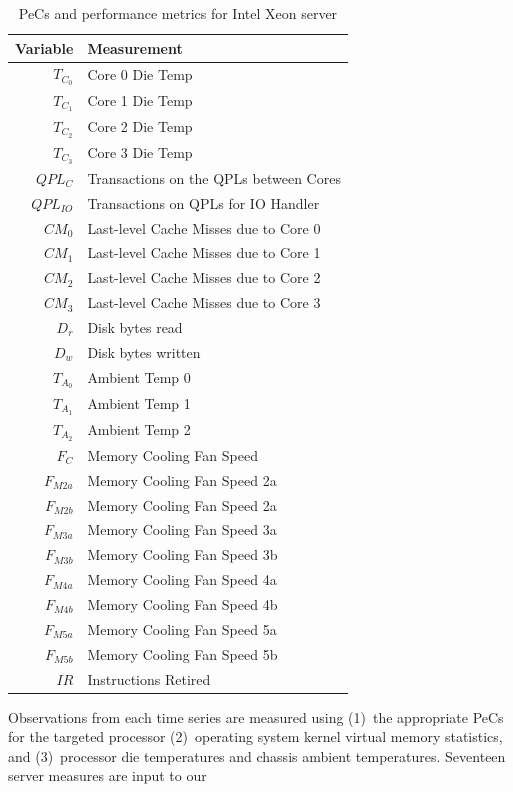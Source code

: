 \documentclass[times, 10pt,twocolumn]{IEEEtran}
\begin{document}
\begin{table}[tbhp]
  \centering
  \caption{PeCs and performance metrics for Intel Xeon server}
  \label{tab:intelmodel}
  \begin{tabular}{r l}
\hline
\textbf{Variable}&\textbf{Measurement}\\
\hline
$T_{C_{0}}$&Core 0 Die Temp\\
$T_{C_{1}}$&Core 1 Die Temp\\
$T_{C_{2}}$&Core 2 Die Temp\\
$T_{C_{3}}$&Core 3 Die Temp\\
$QPL_{C}$&Transactions on the QPLs between Cores\\
$QPL_{IO}$&Transactions on QPLs for IO Handler\\
$CM_{0}$&Last-level Cache Misses due to Core 0\\
$CM_{1}$&Last-level Cache Misses due to Core 1\\
$CM_{2}$&Last-level Cache Misses due to Core 2\\
$CM_{3}$&Last-level Cache Misses due to Core 3\\
$D_{r}$&Disk bytes read\\
$D_{w}$&Disk bytes written\\
$T_{A_{0}}$&Ambient Temp 0\\
$T_{A_{1}}$&Ambient Temp 1\\
$T_{A_{2}}$&Ambient Temp 2\\
$F_{C}$&Memory Cooling Fan Speed\\
$F_{M2a}$&Memory Cooling Fan Speed 2a\\
$F_{M2b}$&Memory Cooling Fan Speed 2a\\
$F_{M3a}$&Memory Cooling Fan Speed 3a\\
$F_{M3b}$&Memory Cooling Fan Speed 3b\\
$F_{M4a}$&Memory Cooling Fan Speed 4a\\
$F_{M4b}$&Memory Cooling Fan Speed 4b\\
$F_{M5a}$&Memory Cooling Fan Speed 5a\\
$F_{M5b}$&Memory Cooling Fan Speed 5b\\
$IR$&Instructions Retired \\
\hline
  \end{tabular}
\end{table}
Observations from each time series are measured using (1)~the appropriate
PeCs for the targeted processor (2)~operating system kernel virtual memory
statistics, and (3)~processor die temperatures and chassis ambient
temperatures.  Seventeen server measures are input to our
\end{document}
